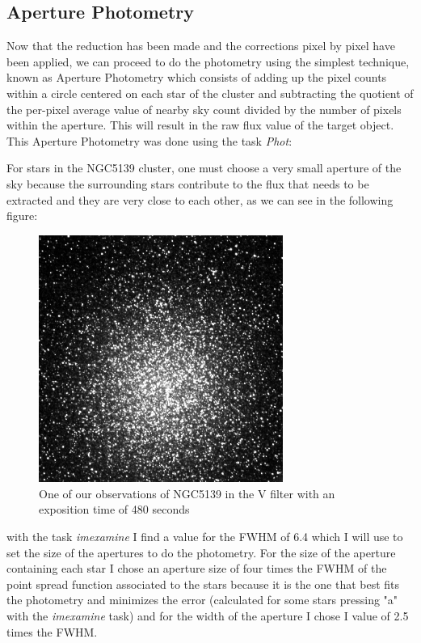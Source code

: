 \subsection{Aperture Photometry}

Now that the reduction has been made and the corrections pixel by pixel have been applied, we can proceed to do the photometry using the simplest technique, known as Aperture Photometry which consists of adding up the pixel counts within a circle centered on each star of the cluster and subtracting the quotient of the per-pixel average value of nearby sky count divided by the number of pixels within the aperture. This will result in the raw flux value of the target object. This Aperture Photometry was done using the task \textit{Phot}:

For stars in the NGC5139 cluster, one must choose a very small aperture of the sky because the surrounding stars contribute to the flux that needs to be extracted and they are very close to each other, as we can see in the following figure: 

\begin{figure}[H]
\centering
\includegraphics[width=8cm]{images/NGC5139_red.png}
\caption[NGC5139 as observed in the V filter]{One of our observations of NGC5139 in the V filter with an exposition time of 480 seconds}
\end{figure}

with the task \textit{imexamine} I find a value for the FWHM of 6.4 which I will use to set the size of the apertures to do the photometry. For the size of the aperture containing each star I chose an aperture size of four times the FWHM of the point spread function associated to the stars because it is the one that best fits the photometry and minimizes the error (calculated for some stars pressing "a" with the \textit{imexamine} task) and for the width of the aperture I chose I value of 2.5 times the FWHM.

